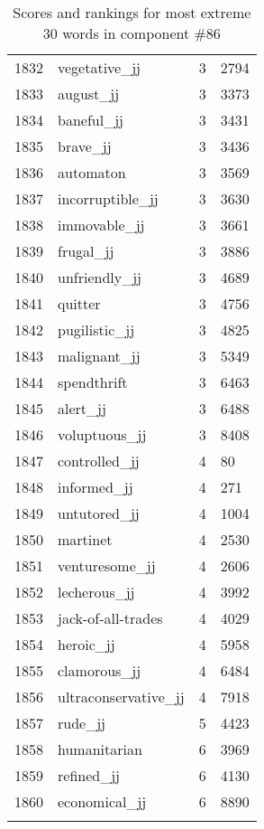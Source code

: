 \begin{longtable}[!htbp]{| rlr@{.}l |}
    1832 & vegetative\_jj & 3 & 2794 \\
    1833 & august\_jj & 3 & 3373 \\
    1834 & baneful\_jj & 3 & 3431 \\
    1835 & brave\_jj & 3 & 3436 \\
    1836 & automaton & 3 & 3569 \\
    1837 & incorruptible\_jj & 3 & 3630 \\
    1838 & immovable\_jj & 3 & 3661 \\
    1839 & frugal\_jj & 3 & 3886 \\
    1840 & unfriendly\_jj & 3 & 4689 \\
    1841 & quitter & 3 & 4756 \\
    1842 & pugilistic\_jj & 3 & 4825 \\
    1843 & malignant\_jj & 3 & 5349 \\
    1844 & spendthrift & 3 & 6463 \\
    1845 & alert\_jj & 3 & 6488 \\
    1846 & voluptuous\_jj & 3 & 8408 \\
    1847 & controlled\_jj & 4 & 80 \\
    1848 & informed\_jj & 4 & 271 \\
    1849 & untutored\_jj & 4 & 1004 \\
    1850 & martinet & 4 & 2530 \\
    1851 & venturesome\_jj & 4 & 2606 \\
    1852 & lecherous\_jj & 4 & 3992 \\
    1853 & jack-of-all-trades & 4 & 4029 \\
    1854 & heroic\_jj & 4 & 5958 \\
    1855 & clamorous\_jj & 4 & 6484 \\
    1856 & ultraconservative\_jj & 4 & 7918 \\
    1857 & rude\_jj & 5 & 4423 \\
    1858 & humanitarian & 6 & 3969 \\
    1859 & refined\_jj & 6 & 4130 \\
    1860 & economical\_jj & 6 & 8890 \\
    \hline
    \caption{Scores and rankings for most extreme 30 words in component \#86} \\
\end{longtable}
